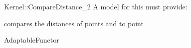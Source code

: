 \begin{ccRefFunctionObjectConcept}{Kernel::CompareDistance_2}
A model for this must provide:


      {compares the distances of points  and  to point }

\ccRefines
AdaptableFunctor

\ccSeeAlso

 \\

\end{ccRefFunctionObjectConcept}
